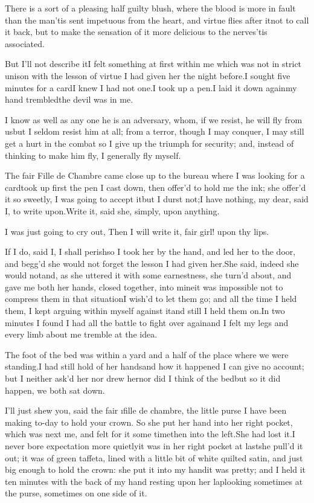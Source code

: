 \documentclass[twoside]{article}
\begin{document}
There is a sort of a pleasing half guilty
blush, where the blood is more in fault
than the man\tskk ’tis sent impetuous
from the heart, and virtue flies after
it\tskk not to call it back, but to make
the sensation of it more delicious to the
nerves\tskk ’tis associated.\tskk 

But I’ll not describe it\tskk I felt
something at first within me which was not
in strict unison with the lesson of virtue
I had given her the night before.\tskk I
sought five minutes for a card\tskk I
knew I had not one.\tskk I took up a
pen.\tskk I laid it down again\tskk my
hand trembled\tskk the devil was in me.

I know as well as any one he is an
adversary, whom, if we resist, he will fly
from us\tskk but I seldom resist him at
all; from a terror, though I may conquer,
I may still get a hurt in the combat\tskk
so I give up the triumph for security;
and, instead of thinking to make him fly,
I generally fly myself.

The fair Fille de Chambre came close
up to the bureau where I was looking for a
card\tskk took up first the pen I cast
down, then offer’d to hold me the ink; she
offer’d it so sweetly, I was going to
accept it\tskk but I durst not;\tskk I
have nothing, my dear, said I, to write
upon.\tskk Write it, said she, simply,
upon anything.\tskk 

I was just going to cry out, Then I will
write it, fair girl! upon thy lips.\tskk 

If I do, said I, I shall perish\tskk so I
took her by the hand, and led her to the
door, and begg’d she would not forget the
lesson I had given her.\tskk She said,
indeed she would not\tskk and, as she
uttered it with some earnestness, she
turn’d about, and gave me both her hands,
closed together, into mine\tskk it was
impossible not to compress them in that
situation\tskk I wish’d to let them go;
and all the time I held them, I kept
arguing within myself against it\tskk and
still I held them on.\tskk In two minutes
I found I had all the battle to fight over
again\tskk and I felt my legs and every
limb about me tremble at the idea.

The foot of the bed was within a yard and
a half of the place where we were
standing.\tskk I had still hold of her
hands\tskk and how it happened I can give
no account; but I neither ask’d her\tskk
nor drew her\tskk nor did I think of the
bed\tskk but so it did happen, we both
sat down.

I’ll just shew you, said the fair \i{fille
de chambre}, the little purse I have been
making to-day to hold your crown.  So she
put her hand into her right pocket, which
was next me, and felt for it some
time\tskk then into the left.\tskk \lqq She
had lost it.\rqq \tskk I never bore
expectation more quietly\tskk it was in
her right pocket at last\tskk she pull’d
it out; it was of green taffeta, lined
with a little bit of white quilted satin,
and just big enough to hold the crown: she
put it into my hand\tskk it was pretty;
and I held it ten minutes with the back of
my hand resting upon her lap\tskk looking
sometimes at the purse, sometimes on one
side of it.
\end{document}
